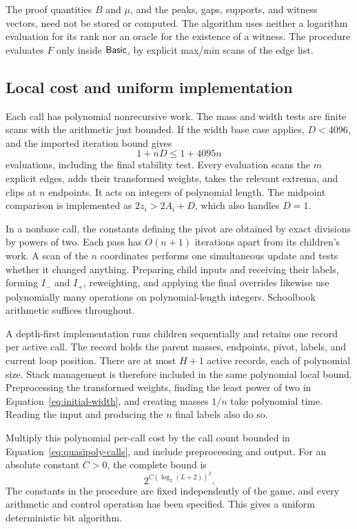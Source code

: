 The proof quantities $B$ and $\mu$, and the peaks, gaps, supports,
and witness vectors, need not be stored or computed. The algorithm
uses neither a logarithm evaluation for its rank nor an oracle for
the existence of a witness. The procedure evaluates $F$ only inside
$\mathsf{Basic}$, by explicit max/min scans of the edge list.

\subsection{Local cost and uniform implementation}

Each call has polynomial nonrecursive work. The mass and width tests
are finite scans with the arithmetic just bounded. If the width base
case applies, $D<4096$, and the imported iteration bound gives
\[
                            1+nD\le1+4095n
\]
evaluations, including the final stability test. Every evaluation
scans the $m$ explicit edges, adds their transformed weights, takes
the relevant extrema, and clips at $n$ endpoints. It acts on integers
of polynomial length. The midpoint comparison is implemented as
$2z_i>2A_i+D$, which also handles $D=1$.

In a nonbase call, the constants defining the pivot are obtained by
exact divisions by powers of two. Each pass has $O(n+1)$ iterations
apart from its children's work. A scan of the $n$ coordinates performs
one simultaneous update and tests whether it changed anything.
Preparing child inputs and receiving their labels, forming $I_-$
and $I_+$, reweighting, and applying the final overrides likewise
use polynomially many operations on polynomial-length integers.
Schoolbook arithmetic suffices throughout.

A depth-first implementation runs children sequentially and retains
one record per active call. The record holds the parent masses,
endpoints, pivot, labels, and current loop position. There are at most
$H+1$ active records, each of polynomial size. Stack management is
therefore included in the same polynomial local bound. Preprocessing
the transformed weights, finding the least power of two in
Equation~\eqref{eq:initial-width}, and creating masses $1/n$ take
polynomial time. Reading the input and producing the $n$ final labels
also do so.

Multiply this polynomial per-call cost by the call count bounded in
Equation~\eqref{eq:quasipoly-calls}, and include preprocessing and
output. For an absolute constant $C>0$, the complete bound is
\begin{equation}
                            2^{C(\log_2(L+2))^2}.
 \label{eq:final-bit-bound}
\end{equation}
The constants in the procedure are fixed independently of the game,
and every arithmetic and control operation has been specified. This
gives a uniform deterministic bit algorithm.

